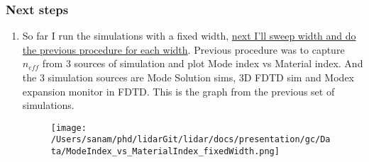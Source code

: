 \documentclass{beamer}
\begin{document}

\begin{frame}
\frametitle{Next steps}
\begin{enumerate}%
\item So far I run the simulations with a fixed width, \underline{next I'll sweep width and do the previous procedure for each width}. Previous procedure was to capture $n_{eff}$ from 3 sources of simulation and plot Mode index vs Material index. And the 3 simulation sources are Mode Solution sims, 3D FDTD sim and Modex expansion monitor in FDTD. This is the graph from the previous set of simulations.
\label{next1}
\begin{figure}[H]
\texttt{[image: /Users/sanam/phd/lidarGit/lidar/docs/presentation/gc/Data/ModeIndex\_vs\_MaterialIndex\_fixedWidth.png]}
\end{figure}
\end{enumerate}
\end{frame}
\end{document}

